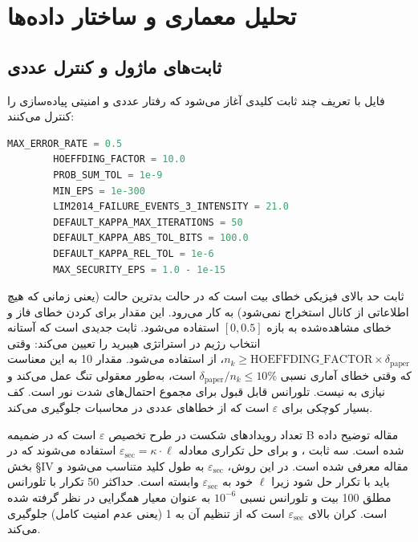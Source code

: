 \section{تحلیل معماری و ساختار داده‌ها}

\subsection{ثابت‌های ماژول و کنترل عددی}

فایل با تعریف چند ثابت کلیدی آغاز می‌شود که رفتار عددی و امنیتی پیاده‌سازی را کنترل می‌کنند:

\begin{LTR}
	\begin{lstlisting}[language=Python]
		MAX_ERROR_RATE = 0.5
		HOEFFDING_FACTOR = 10.0
		PROB_SUM_TOL = 1e-9
		MIN_EPS = 1e-300
		LIM2014_FAILURE_EVENTS_3_INTENSITY = 21.0
		DEFAULT_KAPPA_MAX_ITERATIONS = 50
		DEFAULT_KAPPA_ABS_TOL_BITS = 100.0
		DEFAULT_KAPPA_REL_TOL = 1e-6
		MAX_SECURITY_EPS = 1.0 - 1e-15
	\end{lstlisting}
\end{LTR}

ثابت  حد بالای فیزیکی خطای بیت است که در حالت بدترین حالت (یعنی زمانی که هیچ اطلاعاتی از کانال استخراج نمی‌شود) به کار می‌رود. این مقدار برای  کردن خطای فاز و خطای مشاهده‌شده به بازه $[0, 0.5]$ استفاده می‌شود.  ثابت جدیدی است که آستانه انتخاب رژیم در استراتژی هیبرید را تعیین می‌کند: وقتی $n_k \ge \text{HOEFFDING\_FACTOR} \times \delta_{\text{paper}}$، از  استفاده می‌شود. مقدار 10 به این معناست که وقتی خطای آماری نسبی $\delta_{\text{paper}}/n_k \le 10\%$ است،  به‌طور معقولی تنگ عمل می‌کند و نیازی به  نیست.  تلورانس قابل قبول برای مجموع احتمال‌های شدت نور است.  کف بسیار کوچکی برای $\varepsilon$ است که از خطاهای عددی در محاسبات  جلوگیری می‌کند.

 تعداد رویدادهای شکست در طرح تخصیص $\varepsilon$ است که در ضمیمه B مقاله توضیح داده شده است. سه ثابت ،  و  برای حل تکراری معادله $\varepsilon_{\text{sec}} = \kappa \cdot \ell$ استفاده می‌شوند که در بخش \S IV مقاله معرفی شده است. در این روش، $\varepsilon_{\text{sec}}$ به طول کلید متناسب می‌شود و باید با تکرار حل شود زیرا $\ell$ خود به $\varepsilon_{\text{sec}}$ وابسته است. حداکثر 50 تکرار با تلورانس مطلق 100 بیت و تلورانس نسبی $10^{-6}$ به عنوان معیار همگرایی در نظر گرفته شده است.  کران بالای $\varepsilon_{\text{sec}}$ است که از تنظیم آن به 1 (یعنی عدم امنیت کامل) جلوگیری می‌کند.

